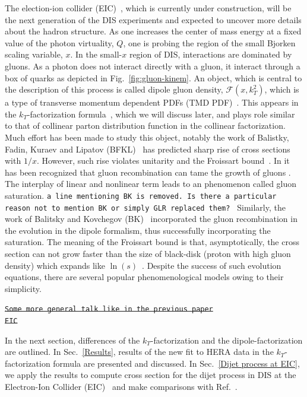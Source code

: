\documentclass[11pt]{article}
\numberwithin{equation}{section}
\numberwithin{table}{section}
\numberwithin{figure}{section}
\newcommand{\comment}[1]{\texttt{\color{red}#1}}
\begin{document}
The election-ion collider (EIC)~\cite{NAP25171}, which is currently under construction, will be the next generation of the DIS experiments and expected to uncover more details about the hadron structure.  
As one increases the center of mass energy at a fixed value of the photon virtuality, $Q$, one is probing the region of the small Bjorken scaling variable, $x$.
In the small-$x$ region of DIS, %
interactions are dominated by gluons\cite{roberts_1990,collins_2011, Kovchegov:2012mbw}. As a photon does not interact directly with a gluon, it interact through a box of quarks as depicted in Fig.~\ref{fig:gluon-kinem}. 
An object, which is central to the description of this process is called dipole gluon density, $\mathcal{F}(x,k_T^2)$, which is a type of transverse momentum dependent PDFs (TMD PDF)~\cite{Bomhof:2006dp,Dominguez:2010xd,Dominguez:2011wm,Xiao:2017yya}. This appears in the $k_T$-factorization formula~\cite{Catani:1990eg,Dominguez:2010xd,Dominguez:2011wm,Xiao:2017yya}, which we will discuss later, and plays role similar to that of collinear parton distribution function in the collinear factorization.
Much effort has been made to study this object, notably the work of Balistky, Fadin, Kuraev and Lipatov (BFKL)~\cite{Balitsky:1978ic, Kuraev:1977fs} has predicted sharp rise of cross sections with $1/x$.  However, such rise violates unitarity and the Froissart bound~\cite{roberts_1990,collins_2011,Kovchegov:2012mbw,Barone:1993sy}. In \cite{Gribov:1983ivg} it has been recognized that gluon recombination can tame the growth of gluons \cite{Gribov:1983ivg}. The interplay of linear and nonlinear term leads to an phenomenon called gluon saturation. \comment{a line mentioning BK is removed. Is there a particular reason not to mention BK or simply GLR replaced them? }%
{\color{gray}Similarly, the work of Balitsky and Kovchegov (BK)~\cite{Balitsky:1995ub,Kovchegov:1999yj} incorporated the gluon recombination in the evolution in the dipole formalism, thus successfully incorporating the saturation.}
 The meaning of the Froissart bound is that, asymptotically, the cross section can not grow faster than the size of black-disk (proton with high gluon density) which expands like $\ln(s)$~\cite{Badelek:1992gs}.
Despite the success of such evolution equations, there are several popular phenomenological models owing to their simplicity. 

\sout{\comment{Some more general talk like in the previous paper}\\ }
\sout{\comment{EIC} }

In the next section, differences of the $k_T$-factorization and the dipole-factorization are outlined.  In Sec.~\ref{Results}, results of the new fit to HERA data in the $k_T$-factorization formula are presented and discussed. In Sec.~\ref{Dijet process at EIC}, we apply the results to compute cross section for the dijet process in DIS at the Electron-Ion Collider (EIC)~\cite{NAP25171} and make comparisons with Ref.~\cite{vanHameren:2021sqc}.\\
\end{document}
